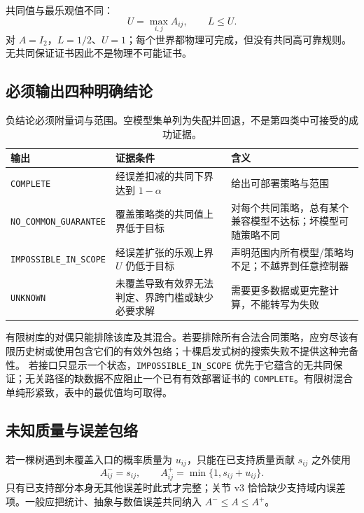 \documentclass[11pt,a4paper,fontset=fandol]{ctexart}
\theoremstyle{definition}
\theoremstyle{remark}\newtheorem{remark}[theorem]{说明}
\numberwithin{equation}{section}
\begin{document}
共同值与最乐观值不同：
\begin{equation}
 U=\max_{i,j}A_{ij},\qquad L\le U.
 \label{eq:optimistic}
\end{equation}
对 $A=I_2$，$L=1/2$、$U=1$；每个世界都物理可完成，但没有共同高可靠规则。无共同保证证书因此不是物理不可能证书。

\subsection{必须输出四种明确结论}
\begin{table}[htbp]\centering\small
\begin{tabularx}{\linewidth}{P{.27\linewidth}YY}\toprule
输出 & 证据条件 & 含义\\\midrule
\texttt{COMPLETE} & 经误差扣减的共同下界达到 $1-\alpha$ & 给出可部署策略与范围\\
\texttt{NO\_COMMON\_GUARANTEE} & 覆盖策略类的共同值上界低于目标 & 对每个共同策略，总有某个兼容模型不达标；坏模型可随策略不同\\
\texttt{IMPOSSIBLE\_IN\_SCOPE} & 经误差扩张的乐观上界 $U$ 仍低于目标 & 声明范围内所有模型/策略均不足；不越界到任意控制器\\
\texttt{UNKNOWN} & 未覆盖导致有效界无法判定、界跨门槛或缺少必要求解 & 需要更多数据或更完整计算，不能转写为失败\\\bottomrule
\end{tabularx}
\caption{负结论必须附量词与范围。空模型集单列为失配并回退，不是第四类中可接受的成功证据。}
\label{tab:status}
\end{table}
有限树库的对偶只能排除该库及其混合。若要排除所有合法合同策略，应穷尽该有限历史树或使用包含它们的有效外包络；十棵启发式树的搜索失败不提供这种完备性。
若接口只显示一个状态，\texttt{IMPOSSIBLE\_IN\_SCOPE} 优先于它蕴含的无共同保证；无关路径的缺数据不应阻止一个已有有效部署证书的 \texttt{COMPLETE}。有限树混合单纯形紧致，表中的最优值均可取得。

\subsection{未知质量与误差包络}
若一棵树遇到未覆盖入口的概率质量为 $u_{ij}$，只能在已支持质量贡献 $s_{ij}$ 之外使用
\begin{equation}
 A^-_{ij}=s_{ij},\qquad A^+_{ij}=\min\{1,s_{ij}+u_{ij}\}.
 \label{eq:unknown}
\end{equation}
只有已支持部分本身无其他误差时此式才完整；关节 v3 恰恰缺少支持域内误差项。一般应把统计、抽象与数值误差共同纳入 $A^-\le A\le A^+$。
\end{document}

